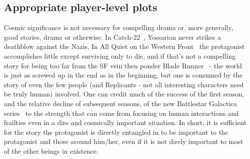 \subsection{Appropriate player-level plots}

Cosmic significance is not necessary for compelling drama or, more
generally, good stories, drama or otherwise. In
Catch-22~\cite{Catch22}, Yossarian never strikes a deathblow against
the Nazis. In All Quiet on the Western
Front~\cite{AllQuietOnTheWesternFront} the protagonist accomplishes
little except surviving only to die, and if that's not a compelling
story for being too far from the SF vein then ponder Blade
Runner~\cite{BladeRunner} - the world is just as screwed up in the end
as in the beginning, but one is consumed by the story of even the few
people (and Replicants - not all interesting characters need be truly
human) involved. One can credit much of the success of the first
season, and the relative decline of subsequent seasons, of the new
Battlestar Galactica series~\cite{NewBattleStar} to the strength that
can come from focusing on human interactions and frailties even in a
dire and cosmically important situation. In short, it is sufficient
for the story the protagonist is directly entangled in to be important
to the protagonist and those around him/her, even if it is not direly
important to most of the other beings in existence.

